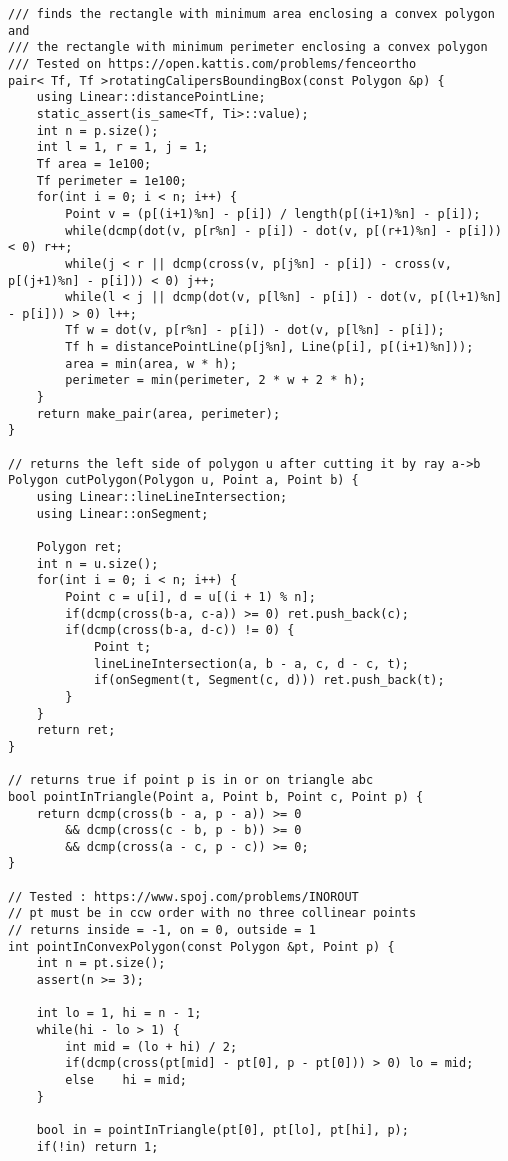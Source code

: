 \documentclass[FSZ,a4paper,onesided]{article}
\begin{document}
\begin{multicols*}{\COLS}
\begin{lstlisting}
/// finds the rectangle with minimum area enclosing a convex polygon and
/// the rectangle with minimum perimeter enclosing a convex polygon
/// Tested on https://open.kattis.com/problems/fenceortho
pair< Tf, Tf >rotatingCalipersBoundingBox(const Polygon &p) {
    using Linear::distancePointLine;
    static_assert(is_same<Tf, Ti>::value);
    int n = p.size();
    int l = 1, r = 1, j = 1;
    Tf area = 1e100;
    Tf perimeter = 1e100;
    for(int i = 0; i < n; i++) {
        Point v = (p[(i+1)%n] - p[i]) / length(p[(i+1)%n] - p[i]);
        while(dcmp(dot(v, p[r%n] - p[i]) - dot(v, p[(r+1)%n] - p[i])) < 0) r++;
        while(j < r || dcmp(cross(v, p[j%n] - p[i]) - cross(v, p[(j+1)%n] - p[i])) < 0) j++;
        while(l < j || dcmp(dot(v, p[l%n] - p[i]) - dot(v, p[(l+1)%n] - p[i])) > 0) l++;
        Tf w = dot(v, p[r%n] - p[i]) - dot(v, p[l%n] - p[i]);
        Tf h = distancePointLine(p[j%n], Line(p[i], p[(i+1)%n]));
        area = min(area, w * h);
        perimeter = min(perimeter, 2 * w + 2 * h);
    }
    return make_pair(area, perimeter);
}

// returns the left side of polygon u after cutting it by ray a->b
Polygon cutPolygon(Polygon u, Point a, Point b) {
    using Linear::lineLineIntersection;
    using Linear::onSegment;

    Polygon ret;
    int n = u.size();
    for(int i = 0; i < n; i++) {
        Point c = u[i], d = u[(i + 1) % n];
        if(dcmp(cross(b-a, c-a)) >= 0) ret.push_back(c);
        if(dcmp(cross(b-a, d-c)) != 0) {
            Point t;
            lineLineIntersection(a, b - a, c, d - c, t);
            if(onSegment(t, Segment(c, d))) ret.push_back(t);
        }
    }
    return ret;
}

// returns true if point p is in or on triangle abc
bool pointInTriangle(Point a, Point b, Point c, Point p) {
    return dcmp(cross(b - a, p - a)) >= 0
        && dcmp(cross(c - b, p - b)) >= 0
        && dcmp(cross(a - c, p - c)) >= 0;
}

// Tested : https://www.spoj.com/problems/INOROUT
// pt must be in ccw order with no three collinear points
// returns inside = -1, on = 0, outside = 1
int pointInConvexPolygon(const Polygon &pt, Point p) {
    int n = pt.size();
    assert(n >= 3);

    int lo = 1, hi = n - 1;
    while(hi - lo > 1) {
        int mid = (lo + hi) / 2;
        if(dcmp(cross(pt[mid] - pt[0], p - pt[0])) > 0) lo = mid;
        else    hi = mid;
    }

    bool in = pointInTriangle(pt[0], pt[lo], pt[hi], p);
    if(!in) return 1;


\end{lstlisting}
\end{multicols*}
\end{document}
